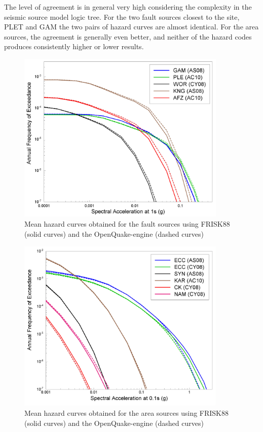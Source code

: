 The level of agreement is in general very high considering the complexity in the seismic source model logic tree. For the two fault sources closest to the site, PLET and GAM the two pairs of hazard curves are almost identical. For the area sources, the agreement is generally even better, and neither of the hazard codes produces consistently higher or lower results.

\begin{figure}
\centering
\includegraphics[width=10cm]{./qareport/pictures/ThyspunktCurvesFault.jpg}
\caption{Mean hazard curves obtained for the fault sources using FRISK88 (solid curves) and the OpenQuake-engine (dashed curves)}
\label{fig:thyspunkt_curves_fault}
\end{figure}

\begin{figure}
\centering
\includegraphics[width=10cm]{./qareport/pictures/ThyspunktCurvesArea.jpg}
\caption{Mean hazard curves obtained for the area sources using FRISK88 (solid curves) and the OpenQuake-engine (dashed curves)}
\label{fig:thyspunkt_curves_area}
\end{figure}